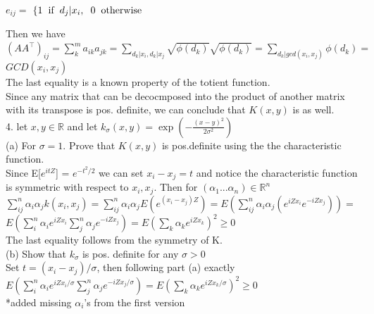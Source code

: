 \documentclass[18pt]{article}
\begin{document}
\begin{flushleft}
   \hspace{4cm}         $e_{ij}=$
                    $\left\{1 \hspace{.2cm} \text{if} \hspace{.2cm} d_j| x_i,\hspace{.2cm} 0 \hspace{.2cm} \text{otherwise} \right.$

\vspace{.4cm}
Then we have\\
\vspace{.4cm}
$\left(A A^{\top}\right)_{ij} = \sum_k^m a_{ik} a_{jk}=\sum \limits_{d_k|x_i, d_k|x_j} \sqrt{\phi(d_k)}\sqrt{\phi(d_k)}=\sum\limits_{d_k|gcd(x_i,x_j)} \phi(d_k)=$\\
$GCD(x_i,x_j)$\\
\vspace{.4cm}
The last equality is a known property of the totient function.\\
\vspace{.4cm}
Since any matrix that can be decocmposed into the product of another matrix\\
with its transpose is pos. definite, we can conclude that $K(x,y)$ is as well.\\
\vspace{.4cm}
4. let $x,y\in \mathbb{R}$ and let $k_\sigma(x,y)=\exp \left(-\frac{(x-y)^2}{2 \sigma^2}\right)$\\
\vspace{.4cm}
(a) For $\sigma=1$. Prove that $K(x,y)$ is pos.definite using the the characteristic function.\\
\vspace{.4cm}
Since E[$e^{itZ}$] = $e^{-t^2/2}$ we can set $x_i-x_j=t$ and notice the characteristic function\\
is symmetric with respect to $x_i,x_j$. Then for $(\alpha_1...\alpha_n)\in\mathbb{R}^n$\\
\vspace{.4cm}
$\sum_{ij}^{n} \alpha_i \alpha_j k(x_i,x_j)=\sum_{ij}^{n} \alpha_i \alpha_j E \left(e^{(x_i-x_j)Z}\right) = E\left(\sum_{ij}^{n}\alpha_i \alpha_j(e^{iZx_i} e^{-iZx_j})\right)=$\\
$E\left(\sum_{i}^{n} \alpha_i e^{iZx_i}\sum_{j}^{n}\alpha_j e^{-iZx_j}\right)=E\left(\sum_k \alpha_k e^{iZx_k}\right)^2 \geq 0$\\
\vspace{.4cm}
The last equality follows from the symmetry of K.\\
(b) Show that $k_\sigma$ is pos. definite for any $\sigma >0$\\
\vspace{.4cm}
Set $t=(x_i-x_j)/\sigma$, then following part (a) exactly\\
$E\left(\sum_{i}^{n}\alpha_i e^{iZx_i/\sigma}\sum_{j}^{n}\alpha_j e^{-iZx_j/\sigma}\right)=E\left(\sum_k \alpha_k e^{iZx_k/\sigma}\right)^2 \geq 0$\\
\vspace{.4cm}
*added missing $\alpha_i$'s from the first version

\end{flushleft}
\end{document}
